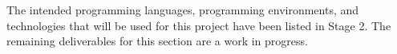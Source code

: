 The intended programming languages, programming environments, and technologies that will be used for this project have been listed in Stage 2. The remaining deliverables for this section are a work in progress. 
